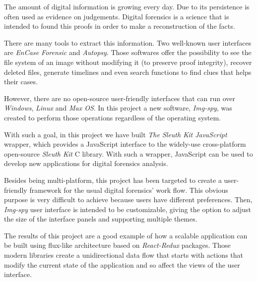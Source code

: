 \documentclass[english,final]{setup/eetac_tfc_pfc}
\begin{document}

\beforepreface  



\begin{overview}{7cm}
The amount of digital information is growing every day. Due to its persistence
is often used as evidence on judgements. Digital forensics is a science that is
intended to found this proofs in order to make a reconstruction of the facts. 

There are many tools to extract this information. Two well-known user
interfaces are \textit{EnCase Forensic} and \textit{Autopsy}. Those softwares
offer the possibility to see the file system of an image without modifying it
(to preserve proof integrity), recover deleted files, generate timelines and
even search functions to find clues that helps their cases.

However, there are no open-source user-friendly interfaces that can run over
\textit{Windows}, \textit{Linux} and \textit{Max OS}. In this project a new
software, \textit{Img-spy}, was created to perform those operations regardless
of the operating system.

With such a goal, in this project we have built \textit{The Sleuth Kit
JavaScript} wrapper, which provides a JavaScript interface to the widely-use
cross-platform open-source \textit{Sleuth Kit} C library.  With such a wrapper,
JavaScript can be used to develop new applications for digital forensics
analysis.

Besides being multi-platform, this project has been targeted to create a
user-friendly framework for the usual digital forensics' work flow. This
obvious purpose is very difficult to achieve because users have different
preferences. Then, \textit{Img-spy} user interface is intended to be
customizable, giving the option to adjust the size of the interface panels and
supporting multiple themes.

The results of this project are a good example of how a scalable application
can be built using flux-like architecture based on \textit{React-Redux}
packages. Those modern libraries create a unidirectional data flow that starts
with actions that modify the current state of the application and so affect the
views of the user interface.
\end{overview}
\end{document}
